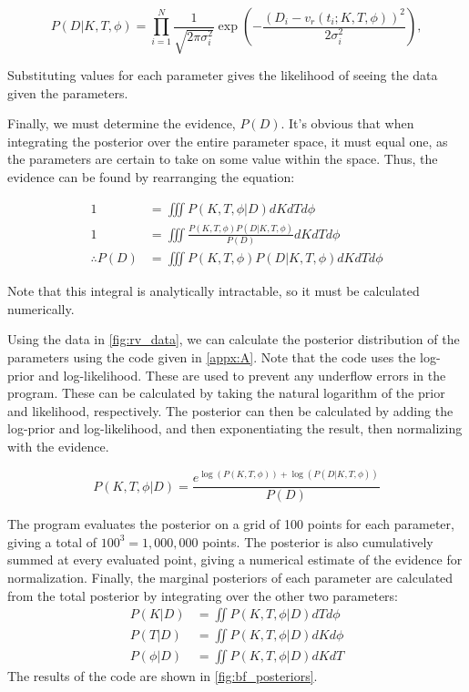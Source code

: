 \documentclass[preprint,longauthor]{aastex631}
\numberwithin{equation}{section}
\begin{document}
\begin{equation}
  P(D|K,T,\phi) = \prod_{i=1}^{N} \frac{1}{\sqrt{2\pi\sigma_i^2}} \exp\left(-\frac{(D_i - v_r(t_i;K,T,\phi))^2}{2\sigma_i^2}\right),
\end{equation}

Substituting values for each parameter gives the likelihood of seeing the data given the parameters.

Finally, we must determine the evidence, $P(D)$. It's obvious that when integrating the posterior over the entire parameter space, it must equal one, as the parameters are certain to take on some value within the space. Thus, the evidence can be found by rearranging the equation:

\begin{align}
  1 &= \iiint P(K,T,\phi|D) dK dT d\phi\nonumber \\
  1 &= \iiint \frac{P(K,T,\phi)P(D|K,T,\phi)}{P(D)} dK dT d\phi \nonumber \\
  \therefore P(D) &= \iiint P(K,T,\phi)P(D|K,T,\phi) dK dT d\phi
\end{align}

Note that this integral is analytically intractable, so it must be calculated numerically.

Using the data in \autoref{fig:rv_data}, we can calculate the posterior distribution of the parameters using the code given in \autoref{appx:A}. Note that the code uses the log-prior and log-likelihood. These are used to prevent any underflow errors in the program. These can be calculated by taking the natural logarithm of the prior and likelihood, respectively. The posterior can then be calculated by adding the log-prior and log-likelihood, and then exponentiating the result, then normalizing with the evidence.

\begin{equation}
  P(K,T,\phi|D) = \frac{e^{\log(P(K,T,\phi)) + \log(P(D|K,T,\phi))}}{P(D)}
\end{equation}

The program evaluates the posterior on a grid of 100 points for each parameter, giving a total of $100^3 = 1,000,000$ points. The posterior is also cumulatively summed at every evaluated point, giving a numerical estimate of the evidence for normalization. Finally, the marginal posteriors of each parameter are calculated from the total posterior by integrating over the other two parameters:
\begin{align}
  P(K|D) &= \iint P(K,T,\phi|D) dT d\phi \\
  P(T|D) &= \iint P(K,T,\phi|D) dK d\phi \\
  P(\phi|D) &= \iint P(K,T,\phi|D) dK dT
\end{align}
The results of the code are shown in \autoref{fig:bf_posteriors}.
\end{document}
